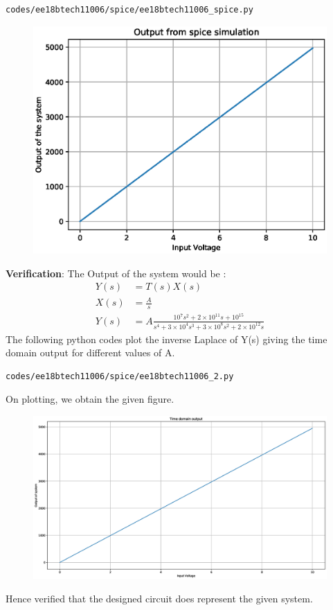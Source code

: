 \begin{enumerate}[label=\arabic*.,ref=\theenumi]
\begin{lstlisting}
codes/ee18btech11006/spice/ee18btech11006_spice.py
\end{lstlisting}
\renewcommand{\thefigure}{\theenumi.\arabic{figure}}
%
\begin{figure}[!ht]
\centering
\includegraphics[width=\columnwidth]{./figs/ee18btech11006/ee18btech11006_8.eps}
\caption{}
\label{fig:ee18btech11006_8}
\end{figure}
\textbf{Verification}: The Output of the system would be :
\begin{align}
    Y(s)&=T(s)X(s)\\
    X(s)&=\frac{A}{s}\\
    Y(s)&=A\frac{10^7s^2+2\times10^{11}s+10^{15}}{s^4+3\times10^4s^3+3\times10^8s^2+2\times10^{12}s}
\end{align}
The following python codes plot the inverse Laplace of Y(s) giving the time domain output for different values of A.
\begin{lstlisting}
codes/ee18btech11006/spice/ee18btech11006_2.py
\end{lstlisting}
On plotting, we obtain the given figure.\\
\begin{figure}[!ht]
\centering
\includegraphics[width=\columnwidth]{./figs/ee18btech11006/ee18btech11006_9.eps}
\caption{}
\label{fig:ee18btech11006_9}
\end{figure}
Hence verified that the designed circuit does represent the given system.
\end{enumerate}


